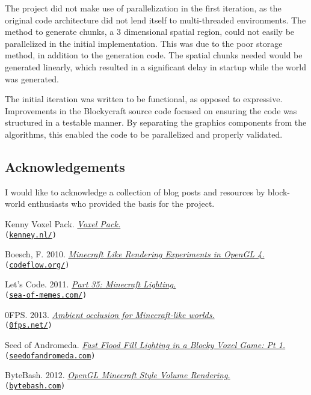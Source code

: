 \documentclass[a4paper,11pt,titlepage]{scrartcl}
\newcommand{\Blockycraft}{Blockycraft}
\begin{document}
The project did not make use of parallelization in the first iteration, as the original code architecture did not lend itself to multi-threaded environments.  The method to generate chunks, a 3 dimensional spatial region, could not easily be parallelized in the initial implementation.  This was due to the poor storage method, in addition to the generation code.  The spatial chunks needed would be generated linearly, which resulted in a significant delay in startup while the world was generated.

The initial iteration was written to be functional, as opposed to expressive.  Improvements in the \Blockycraft{} source code focused on ensuring the code was structured in a testable manner.  By separating the graphics components from the algorithms, this enabled the code to be parallelized and properly validated.

\subsection{Acknowledgements}
I would like to acknowledge a collection of blog posts and resources by block-world enthusiasts who provided the basis for the project.

\begin{enumerate}[label*={[\arabic{enumi}]}]
\item Kenny Voxel Pack. {\em \href{http://kenney.nl/assets/voxel-pack}{Voxel Pack.}} \\\texttt{(\url{kenney.nl/})}
\item Boesch, F. 2010. {\em \href{http://codeflow.org/entries/2010/dec/09/minecraft-like-rendering-experiments-in-opengl-4/#ambient-occlusion}{Minecraft Like Rendering Experiments in OpenGL 4.}}\\\texttt{(\url{codeflow.org/})}
\item Let's Code. 2011. {\em \href{http://www.sea-of-memes.com/LetsCode35/LetsCode35.html}{Part 35: Minecraft Lighting.}}\\\texttt{(\url{sea-of-memes.com/})}
\item 0FPS. 2013. {\em \href{https://0fps.net/2013/07/03/ambient-occlusion-for-minecraft-like-worlds/}{Ambient occlusion for Minecraft-like worlds.}}\\\texttt{(\url{0fps.net/})}
\item Seed of Andromeda. {\em \href{https://www.seedofandromeda.com/blogs/29-fast-flood-fill-lighting-in-a-blocky-voxel-game-pt-1/}{Fast Flood Fill Lighting in a Blocky Voxel Game: Pt 1.}}\\\texttt{(\url{seedofandromeda.com})}
\item ByteBash. 2012. {\em \href{http://bytebash.com/2012/03/opengl-volume-rendering/}{OpenGL Minecraft Style Volume Rendering.}} \\\texttt{(\url{bytebash.com})}
\end{enumerate}
\end{document}
